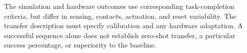 The simulation and hardware outcomes use corresponding task-completion criteria, but differ in sensing, contacts, actuation, and reset variability. The transfer description must specify calibration and any hardware adaptation. A successful sequence alone does not establish zero-shot transfer, a particular success percentage, or superiority to the baseline.
